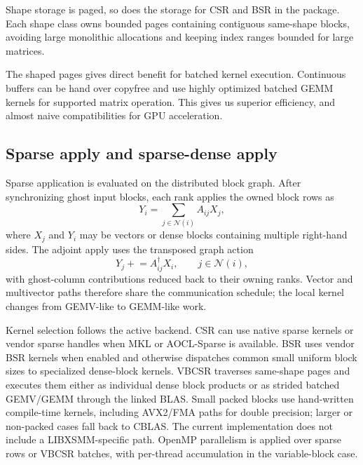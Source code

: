 \documentclass[
reprint,
superscriptaddress,
frontmatterverbose,
amsmath,amssymb,
pra,
]{revtex4-2}
\begin{document}
Shape storage is paged, so does the storage for CSR and BSR in the package.  Each shape class owns bounded pages containing
contiguous same-shape blocks, avoiding large monolithic allocations and keeping
index ranges bounded for large matrices.

The shaped pages gives direct benefit for batched kernel execution. Continuous buffers can be hand over copyfree and use highly optimized batched GEMM kernels for supported matrix operation. This gives us superior efficiency, and almost naive compatibilities for GPU acceleration.

\subsection{Sparse apply and sparse-dense apply}

Sparse application is evaluated on the distributed block graph.  After
synchronizing ghost input blocks, each rank applies the owned block rows as
\begin{equation}
    Y_i = \sum_{j \in \mathcal{N}(i)} A_{ij} X_j ,
    \label{eq:block_apply_local}
\end{equation}
where $X_j$ and $Y_i$ may be vectors or dense blocks containing multiple
right-hand sides.  The adjoint apply uses the transposed graph action
\begin{equation}
    Y_j \mathrel{+}= A_{ij}^{\dagger} X_i,\qquad j\in\mathcal{N}(i),
    \label{eq:block_apply_adjoint}
\end{equation}
with ghost-column contributions reduced back to their owning ranks.  Vector and
multivector paths therefore share the communication schedule; the local kernel
changes from GEMV-like to GEMM-like work.

Kernel selection follows the active backend.  CSR can use native sparse kernels
or vendor sparse handles when MKL or AOCL-Sparse is available.  BSR uses vendor
BSR kernels when enabled and otherwise dispatches common small uniform block
sizes to specialized dense-block kernels.  VBCSR traverses same-shape pages and
executes them either as individual dense block products or as strided batched
GEMV/GEMM through the linked BLAS.  Small packed blocks use hand-written
compile-time kernels, including AVX2/FMA paths for double precision; larger or
non-packed cases fall back to CBLAS.  The current implementation does not
include a LIBXSMM-specific path.  OpenMP parallelism is applied over sparse rows
or VBCSR batches, with per-thread accumulation in the variable-block case.
\end{document}
